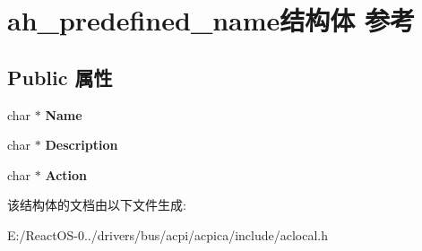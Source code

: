 \hypertarget{structah__predefined__name}{}\section{ah\+\_\+predefined\+\_\+name结构体 参考}
\label{structah__predefined__name}
\subsection*{Public 属性}
\begin{DoxyCompactItemize}
\item 
\mbox{\label{structah__predefined__name_ab2b124fe7506916a81b4d24e2ab9d5a3}} 
char $\ast$ {\bfseries Name}
\item 
\mbox{\label{structah__predefined__name_ad0585cd5d3a116fccfaa3be113a7ff0a}} 
char $\ast$ {\bfseries Description}
\item 
\mbox{\label{structah__predefined__name_aea77196ba47cc3fb35e9d05d79583dfa}} 
char $\ast$ {\bfseries Action}
\end{DoxyCompactItemize}


该结构体的文档由以下文件生成\+:\begin{DoxyCompactItemize}
\item 
E\+:/\+React\+O\+S-\/0../drivers/bus/acpi/acpica/include/aclocal.\+h\end{DoxyCompactItemize}
